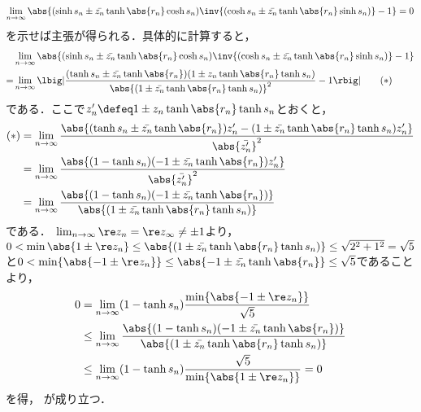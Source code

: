 \begin{ncalcof}
    
  \begin{align*}
    \lim_{n\to \infty}\abs{(\sinh s_n \pm \bar{z_n} \tanh \abs{r_n} \cosh s_n)\inv{(\cosh s_n \pm \bar{z_n} \tanh \abs{r_n} \sinh s_n) } - 1} = 0
  \end{align*}
  を示せば主張が得られる．具体的に計算すると，
  \begin{align}
    &\lim_{n\to \infty}\abs{(\sinh s_n \pm \bar{z_n} \tanh \abs{r_n} \cosh s_n)\inv{(\cosh s_n \pm \bar{z_n} \tanh \abs{r_n} \sinh s_n) } - 1}\notag \\
    = & \lim_{n\to \infty}\lbig|\frac{(\tanh s_n\pm \bar{z_n}\tanh \abs{r_n})(1 \pm z_n \tanh\abs{r_n}\tanh s_n )}{\abs{(1 \pm \bar{z_n} \tanh\abs{r_n}\tanh s_n )}^2} - 1 \rbig|\label{eq:ast} \tag{$\ast$}  
  \end{align}
  である．ここで$ z_n'\defeq 1 \pm z_n\tanh\abs{r_n}\tanh s_n$とおくと，
  \begin{align*}
    (\ast)&=  \lim_{n\to \infty}\frac{\abs{(\tanh s_n\pm \bar{z_n}\tanh \abs{r_n})z_n' - (1 \pm \bar{z_n} \tanh\abs{r_n}\tanh s_n )z_n' }}{\abs{\bar{z_n'}}^2}\\
    &= \lim_{n\to \infty}\frac{\abs{(1-\tanh s_n)(-1\pm \bar{z_n}\tanh \abs{r_n} )z_n'}}{\abs{\bar{z_n'}}^2} \\
    &= \lim_{n\to \infty}\frac{\abs{(1-\tanh s_n)(-1\pm \bar{z_n}\tanh \abs{r_n} )}}{\abs{(1 \pm \bar{z_n} \tanh\abs{r_n}\tanh s_n )}} 
  \end{align*}
  である．
  $\lim_{n\to \infty} \re z_n = \re z_{\infty} \neq \pm 1$より，$0 < \min{\abs{1\pm \re z_n}}\leq  \abs{(1 \pm \bar{z_n} \tanh\abs{r_n}\tanh s_n )}\leq \sqrt{2^2 + 1^2} = \sqrt{5} $と$0< \min\{\abs{-1\pm \re z_n } \}  \leq \abs{-1\pm\bar{z_n}\tanh \abs{r_n} } \leq \sqrt{5} $であることより，
    \begin{align*}
      0 &= \lim_{n\to \infty}(1-\tanh s_n)\frac{\min\{\abs{-1\pm \re z_n} \}}{\sqrt{5}} \\
        &\leq \lim_{n\to \infty}\frac{\abs{(1-\tanh s_n)(-1\pm \bar{z_n}\tanh \abs{r_n} )}}{\abs{(1 \pm \bar{z_n} \tanh\abs{r_n}\tanh s_n )}}\\
      &\leq \lim_{n\to \infty}(1-\tanh s_n)\frac{\sqrt{5}}{\min\{\abs{1\pm \re z_n} \}} = 0
    \end{align*}
    を得， が成り立つ．
\end{ncalcof}

